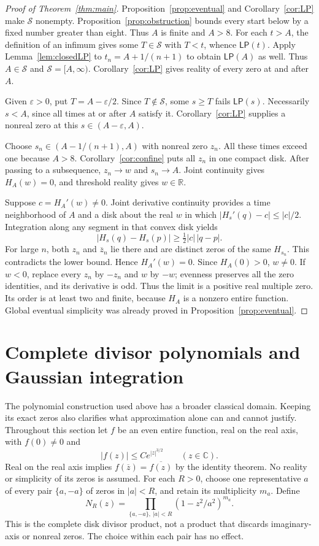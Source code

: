 \documentclass[11pt]{article}
\theoremstyle{remark}\newtheorem{remark}[theorem]{Remark}
\newcommand{\R}{\mathbb R}\newcommand{\C}{\mathbb C}
\begin{document}
\begin{proof}[Proof of Theorem~\ref{thm:main}]
Proposition~\ref{prop:eventual} and Corollary~\ref{cor:LP}
make $\mathcal S$ nonempty. Proposition~\ref{prop:obstruction}
bounds every start below by a fixed number greater than eight.
Thus $A$ is finite and $A>8$.
For each $t>A$, the definition of an infimum gives some
$T\in\mathcal S$ with $T<t$, whence $\mathsf{LP}(t)$.
Apply Lemma~\ref{lem:closedLP} to $t_n=A+1/(n+1)$ to obtain
$\mathsf{LP}(A)$ as well. Thus $A\in\mathcal S$ and
$\mathcal S=[A,\infty)$. Corollary~\ref{cor:LP} gives
reality of every zero at and after $A$.

Given $\varepsilon>0$, put $T=A-\varepsilon/2$.
Since $T\notin\mathcal S$, some $s\geq T$ fails
$\mathsf{LP}(s)$. Necessarily $s<A$, since all times at or
after $A$ satisfy it. Corollary~\ref{cor:LP} supplies a
nonreal zero at this $s\in(A-\varepsilon,A)$.

Choose $s_n\in(A-1/(n+1),A)$ with nonreal zero $z_n$.
All these times exceed one because $A>8$.
Corollary~\ref{cor:confine} puts all $z_n$ in one compact
disk. After passing to a subsequence, $z_n\to w$ and
$s_n\to A$. Joint continuity gives $H_A(w)=0$, and
threshold reality gives $w\in\R$.

Suppose $c=H_A'(w)\ne0$. Joint derivative continuity provides
a time neighborhood of $A$ and a disk about the real $w$ in
which $|H_s'(q)-c|\leq|c|/2$.
Integration along any segment in that convex disk yields
\[
 |H_s(q)-H_s(p)|\geq\tfrac12|c|\,|q-p|.
\]
For large $n$, both $z_n$ and $\overline z_n$ lie there and
are distinct zeros of the same $H_{s_n}$. This contradicts
the lower bound. Hence $H_A'(w)=0$.
Since $H_A(0)>0$, $w\ne0$. If $w<0$, replace every $z_n$
by $-z_n$ and $w$ by $-w$; evenness preserves all the zero
identities, and its derivative is odd. Thus the limit is a
positive real multiple zero. Its order is at least two and finite, because
$H_A$ is a nonzero entire function. Global eventual
simplicity was already proved in
Proposition~\ref{prop:eventual}.
\end{proof}


\section{Complete divisor polynomials and Gaussian integration}
The polynomial construction used above has a broader classical domain.
Keeping its exact zeros also clarifies what approximation alone can and
cannot justify. Throughout this section let $f$ be an even entire function,
real on the real axis, with $f(0)\ne0$ and
\begin{equation}\label{eq:generalbudgetgrowth}
 |f(z)|\leq C e^{|z|^{3/2}}\qquad(z\in\C).
\end{equation}
Real on the real axis implies $f(\overline z)=\overline{f(z)}$ by the
identity theorem. No reality or simplicity of its zeros is assumed.
For each $R>0$, choose one representative $a$ of every pair $\{a,-a\}$
of zeros in $|a|<R$, and retain its multiplicity $m_a$. Define
\[
 N_R(z)=\prod_{\{a,-a\},\ |a|<R}(1-z^2/a^2)^{m_a}.
\]
This is the complete disk divisor product, not a product that discards
imaginary-axis or nonreal zeros. The choice within each pair has no effect.
\end{document}

